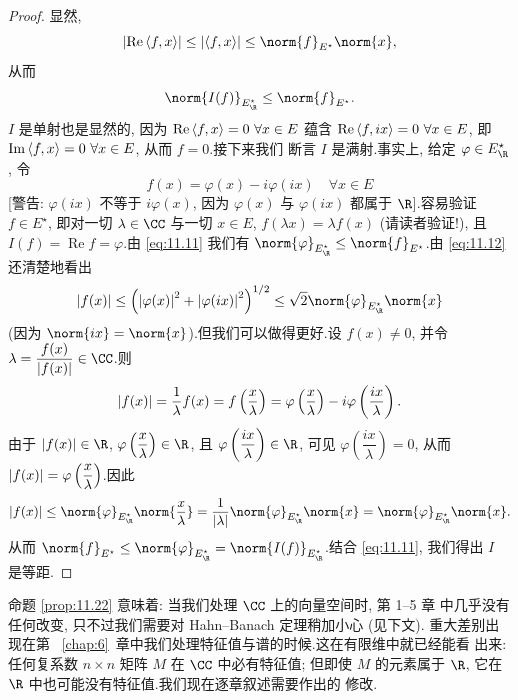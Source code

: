 \begin{proof}
显然,
\begin{equation*}
\abs{\operatorname{Re}\dual{f}{x}}\le\abs{\dual{f}{x}}\le\norm{f}_{E^\star}\norm{x},
\end{equation*}
从而
\begin{equation}
\norm{I(f)}_{E^\star_\R}\le\norm{f}_{E^\star}.
\label{eq:11.11}
\end{equation}
$I$ 是单射也是显然的, 因为 $\operatorname{Re}\left\langle f,x\right\rangle=0\ \forall x\in E$
蕴含 $\operatorname{Re}\left\langle f,ix\right\rangle=0\ \forall x\in E$, 即
$\operatorname{Im}\dual{f}{x}=0\ \forall x\in E$, 从而 $f=0$.接下来我们
断言 $I$ 是满射.事实上, 给定 $\varphi\in E^\star_\R$, 令
\begin{equation}
f(x)=\varphi(x)-i\varphi(ix)\quad\forall x\in E
\label{eq:11.12}
\end{equation}
[警告: $\varphi(ix)$ 不等于 $i\varphi(x)$, 因为 $\varphi(x)$ 与
$\varphi(ix)$ 都属于 $\R$].容易验证 $f\in E^\star$, 即对一切
$\lambda\in\CC$ 与一切 $x\in E$, $f(\lambda x)=\lambda f(x)$ (请读者验证!),
且 $I(f)=\operatorname{Re}f=\varphi$.由 \eqref{eq:11.11} 我们有
$\norm{\varphi}_{E^\star_\R}\le\norm{f}_{E^\star}$.由 \eqref{eq:11.12}
还清楚地看出
\begin{equation*}
\abs{f(x)}\le\left(\abs{\varphi(x)}^2+\abs{\varphi(ix)}^2\right)^{1/2}
\le\sqrt{2}\norm{\varphi}_{E^\star_\R}\norm{x}
\end{equation*}
(因为 $\norm{ix}=\norm{x}$).但我们可以做得更好.设 $f(x)\ne0$, 并令
$\lambda=\dfrac{f(x)}{\abs{f(x)}}\in\CC$.则
\begin{equation*}
\left|f(x)\right|=\frac1\lambda f(x)=f\left(\frac{x}{\lambda}\right)
=\varphi\left(\frac{x}{\lambda}\right)-i\varphi\left(\frac{ix}{\lambda}\right).
\end{equation*}
由于 $\abs{f(x)}\in\R$, $\varphi\left(\dfrac{x}{\lambda}\right)\in\R$, 且
$\varphi\left(\dfrac{ix}{\lambda}\right)\in\R$, 可见
$\varphi\left(\dfrac{ix}{\lambda}\right)=0$, 从而
$\left|f(x)\right|=\varphi\left(\dfrac{x}{\lambda}\right)$.因此
\begin{equation*}
\abs{f(x)}\le\norm{\varphi}_{E^\star_\R}\norm{\frac{x}{\lambda}}
=\frac1{\abs{\lambda}}\norm{\varphi}_{E^\star_\R}\norm{x}
=\norm{\varphi}_{E^\star_\R}\norm{x}.
\end{equation*}
从而 $\norm{f}_{E^\star}\le\norm{\varphi}_{E^\star_\R}
=\norm{I(f)}_{E^\star_\R}$.结合 \eqref{eq:11.11}, 我们得出 $I$ 是等距.
\end{proof}

命题  \ref{prop:11.22} 意味着: 当我们处理 $\CC$ 上的向量空间时, 第 1--5 章
中几乎没有任何改变, 只不过我们需要对 Hahn--Banach 定理稍加小心 (见下文).
重大差别出现在第~
\ref{chap:6}~章中我们处理特征值与谱的时候.这在有限维中就已经能看
出来: 任何复系数 $n\times n$ 矩阵 $M$ 在 $\CC$ 中必有特征值; 但即使 $M$
的元素属于 $\R$, 它在 $\R$ 中也可能没有特征值.我们现在逐章叙述需要作出的
修改.

